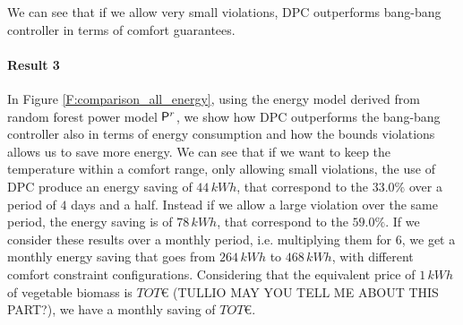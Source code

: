 We can see that if we allow very small violations, DPC outperforms bang-bang controller in terms of comfort guarantees.

\paragraph{Result 3} In Figure \ref{F:comparison_all_energy}, using the energy model derived from random forest power model $\mathsf{P}^r$, we show how DPC outperforms the bang-bang controller also in terms of energy consumption and how the bounds violations allows us to save more energy. We can see that if we want to keep the temperature within a comfort range, only allowing small violations, the use of DPC produce an energy saving of $44\, kWh$, that correspond to the $33.0\%$ over a period of $4$ days and a half. Instead if we allow a large violation over the same period, the energy saving is of $78\, kWh$, that correspond to the $59.0\%$. If we consider these results over a monthly period, i.e. multiplying them for $6$, we get a monthly energy saving that goes from $264\,kWh$ to $468\,kWh$, with different comfort constraint configurations. Considering that the equivalent price of $1\,kWh$ of vegetable biomass is $TOT$\euro{} (TULLIO MAY YOU TELL ME ABOUT THIS PART?), we have a monthly saving of $TOT$\euro{}.

